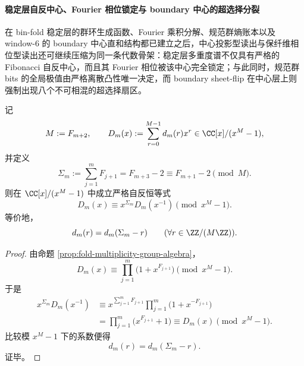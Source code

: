 \paragraph{稳定层自反中心、Fourier 相位锁定与 boundary 中心的超选择分裂}
在 bin-fold 稳定层的群环生成函数、Fourier 乘积分解、规范群熵账本以及 window-\(6\) 的 boundary 中心直和结构都已建立之后，中心投影型读出与保纤维相位型读出还可继续压缩为同一条代数骨架：稳定层多重度谱不仅具有严格的 Fibonacci 自反中心，而且其 Fourier 相位被该中心完全锁定；与此同时，规范群 bits 的全局极值由严格离散凸性唯一决定，而 boundary sheet-flip 在中心层上则强制出现八个不可相混的超选择扇区。

\begin{theorem}[稳定层多重度谱的自反中心]\label{thm:xi-time-part60ab2-stable-spectrum-selfreciprocal-center}
记
\[
M:=F_{m+2},
\qquad
D_m(x):=\sum_{r=0}^{M-1}d_m(r)x^r\in \CC[x]/(x^M-1),
\]
并定义
\[
\Sigma_m:=\sum_{j=1}^{m}F_{j+1}=F_{m+3}-2\equiv F_{m+1}-2\pmod M.
\]
则在 \(\CC[x]/(x^M-1)\) 中成立严格自反恒等式
\[
D_m(x)\equiv x^{\Sigma_m}D_m(x^{-1})\pmod{x^M-1}.
\]
等价地，
\[
d_m(r)=d_m(\Sigma_m-r)
\qquad (\forall r\in \ZZ/(M\ZZ)).
\]
\end{theorem}
\begin{proof}
由命题 \ref{prop:fold-multiplicity-group-algebra}，
\[
D_m(x)\equiv \prod_{j=1}^{m}\bigl(1+x^{F_{j+1}}\bigr)\pmod{x^M-1}.
\]
于是
\[
\begin{aligned}
x^{\Sigma_m}D_m(x^{-1})
&\equiv
x^{\sum_{j=1}^{m}F_{j+1}}
\prod_{j=1}^{m}\bigl(1+x^{-F_{j+1}}\bigr)\\
&=
\prod_{j=1}^{m}\bigl(x^{F_{j+1}}+1\bigr)
\equiv
D_m(x)
\pmod{x^M-1}.
\end{aligned}
\]
比较模 \(x^M-1\) 下的系数便得
\[
d_m(r)=d_m(\Sigma_m-r).
\]
证毕。
\end{proof}

